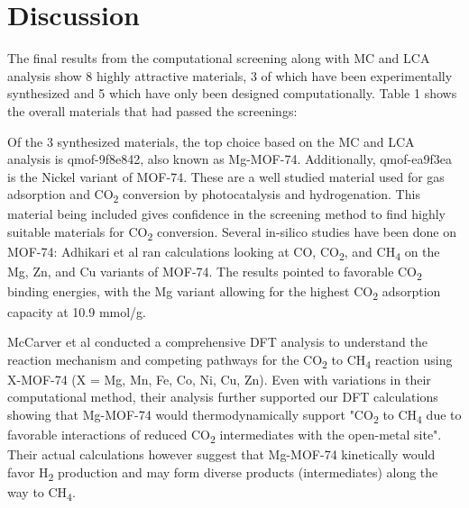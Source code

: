 \documentclass[twoside,twocolumn,9pt]{article}
\begin{document}
\section{Discussion}

The final results from the computational screening along with MC and LCA analysis show 8 highly attractive materials, 3 of which have been experimentally synthesized and 5 which have only been designed computationally.  Table 1 shows the overall materials that had passed the screenings:



\par

Of the 3 synthesized materials, the top choice based on the MC and LCA analysis is qmof-9f8e842, also known as Mg-MOF-74\cite{rosi_rod_2005}. Additionally, qmof-ea9f3ea is the Nickel variant of MOF-74. These are a well studied material used for gas adsorption and CO\textsubscript{2} conversion by photocatalysis and hydrogenation\cite{adhikari_mg-mof-74_2025, yang_co2_2012, britt_highly_2009, yasumura_co2_2025, stolar_scalable_2021, zurrer_mixed-metal_2021, dong_ligand_2024}. This material being included gives confidence in the screening method to find highly suitable materials for CO\textsubscript{2} conversion. Several in-silico studies have been done on MOF-74: Adhikari et al\cite{adhikari_silico_2025} ran calculations looking at CO, CO\textsubscript{2}, and CH\textsubscript{4} on the Mg, Zn, and Cu variants of MOF-74. The results pointed to favorable CO\textsubscript{2} binding energies, with the Mg variant allowing for the highest CO\textsubscript{2} adsorption capacity at 10.9 mmol/g. 
\par
McCarver et al\cite{mccarver_catalyst_2023} conducted a comprehensive DFT analysis to understand the reaction mechanism and competing pathways for the CO\textsubscript{2} to CH\textsubscript{4} reaction using X-MOF-74 (X = Mg, Mn, Fe, Co, Ni, Cu, Zn). Even with variations in their computational method, their analysis further supported our DFT calculations showing that Mg-MOF-74 would thermodynamically support "CO\textsubscript{2} to CH\textsubscript{4} due to favorable interactions of reduced CO\textsubscript{2} intermediates with the open-metal site". Their actual calculations however suggest that Mg-MOF-74 kinetically would favor H\textsubscript{2} production and may form diverse products (intermediates) along the way to CH\textsubscript{4}. 
\par
\end{document}
